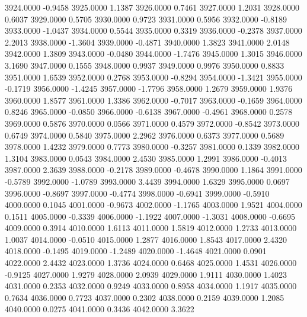 3924.0000     -0.9458
3925.0000      1.1387
3926.0000      0.7461
3927.0000      1.2031
3928.0000      0.6037
3929.0000      0.5705
3930.0000      0.9723
3931.0000      0.5956
3932.0000     -0.8189
3933.0000     -1.0437
3934.0000      0.5544
3935.0000      0.3319
3936.0000     -0.2378
3937.0000      2.2013
3938.0000     -1.3604
3939.0000     -0.4871
3940.0000      1.3823
3941.0000      2.0148
3942.0000      1.3809
3943.0000     -0.0480
3944.0000     -1.7476
3945.0000      1.3015
3946.0000      3.1690
3947.0000      0.1555
3948.0000      0.9937
3949.0000      0.9976
3950.0000      0.8833
3951.0000      1.6539
3952.0000      0.2768
3953.0000     -0.8294
3954.0000     -1.3421
3955.0000     -0.1719
3956.0000     -1.4245
3957.0000     -1.7796
3958.0000      1.2679
3959.0000      1.9376
3960.0000      1.8577
3961.0000      1.3386
3962.0000     -0.7017
3963.0000     -0.1659
3964.0000      0.8246
3965.0000     -0.0850
3966.0000     -0.6138
3967.0000     -0.4961
3968.0000      0.2578
3969.0000      0.5876
3970.0000      0.0566
3971.0000      0.4579
3972.0000     -0.8542
3973.0000      0.6749
3974.0000      0.5840
3975.0000      2.2962
3976.0000      0.6373
3977.0000      0.5689
3978.0000      1.4232
3979.0000      0.7773
3980.0000     -0.3257
3981.0000      0.1339
3982.0000      1.3104
3983.0000      0.0543
3984.0000      2.4530
3985.0000      1.2991
3986.0000     -0.4013
3987.0000      2.3639
3988.0000     -0.2178
3989.0000     -0.4678
3990.0000      1.1864
3991.0000     -0.5789
3992.0000     -1.0789
3993.0000      3.4439
3994.0000      1.6329
3995.0000      0.0697
3996.0000     -0.8697
3997.0000     -0.4774
3998.0000     -0.6941
3999.0000     -0.5910
4000.0000      0.1045
4001.0000     -0.9673
4002.0000     -1.1765
4003.0000      1.9521
4004.0000      0.1511
4005.0000     -0.3339
4006.0000     -1.1922
4007.0000     -1.3031
4008.0000     -0.6695
4009.0000      0.3914
4010.0000      1.6113
4011.0000      1.5819
4012.0000      1.2733
4013.0000      1.0037
4014.0000     -0.0510
4015.0000      1.2877
4016.0000      1.8543
4017.0000      2.4320
4018.0000     -0.1495
4019.0000     -1.2489
4020.0000     -1.4648
4021.0000      0.0901
4022.0000      2.4432
4023.0000      1.3736
4024.0000      0.6468
4025.0000      1.4531
4026.0000     -0.9125
4027.0000      1.9279
4028.0000      2.0939
4029.0000      1.9111
4030.0000      1.4023
4031.0000      0.2353
4032.0000      0.9249
4033.0000      0.8958
4034.0000      1.1917
4035.0000      0.7634
4036.0000      0.7723
4037.0000      0.2302
4038.0000      0.2159
4039.0000      1.2085
4040.0000      0.0275
4041.0000      0.3436
4042.0000      3.3622
